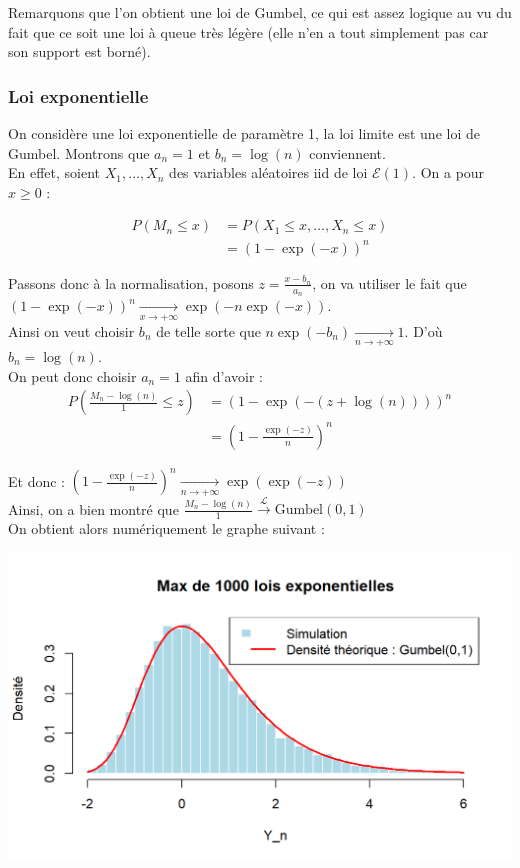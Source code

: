 \documentclass{article}
\theoremstyle{plain}
\theoremstyle{definition}
\theoremstyle{plain}
\begin{document}
\noindent Remarquons que l'on obtient une loi de Gumbel, ce qui est assez logique au vu du fait que ce soit une loi à queue très légère (elle n'en a tout simplement pas car son support est borné).

\subsubsection{Loi exponentielle}
\noindent On considère une loi exponentielle de paramètre 1, la loi limite est une loi de Gumbel. Montrons que $a_n = 1 $ et $b_n = \log(n) $ conviennent. \\
\noindent En effet, soient $X_1, \dots, X_n$ des variables aléatoires iid de loi $\mathcal{E}(1)$. On a pour $ x \geq 0 $ :

\begin{align*}
	P(M_n \leq x) &= P(X_1 \leq x, \dots, X_n \leq x) \\
	&= (1-\exp(- x))^n
\end{align*}

\noindent Passons donc à la normalisation, posons $z=\frac{x-b_n}{a_n}$, on va utiliser le fait que $(1-\exp(- x))^n \xrightarrow[x \to +\infty]{} \exp(-n\exp(-x)) $. \\
\noindent Ainsi on veut choisir $b_n$ de telle sorte que $n \exp(-b_n) \xrightarrow[n \to +\infty]{} 1 $. D'où $b_n = \log(n)$. \\
\noindent On peut donc choisir $ a_n = 1$ afin d'avoir : 
\begin{align*}
	P(\frac{M_n - \log(n)}{1} \leq z) &= (1 - \exp(-(z+\log(n))))^n \\
	&= (1 - \frac{\exp(-z)}{n})^n 
\end{align*}

\noindent Et donc : $ (1 - \frac{\exp(-z)}{n})^n \xrightarrow[n \to +\infty]{} \exp(\exp(-z))$ \\

\noindent Ainsi, on a bien montré que $\frac{M_n - \log(n)}{1} \xrightarrow{\mathcal{L}} \text{Gumbel}(0,1) $ \\

\noindent On obtient alors numériquement le graphe suivant :

\begin{center}
	\includegraphics[scale=0.8]{./images/Max_Expo.png} 
\end{center}
\end{document}
